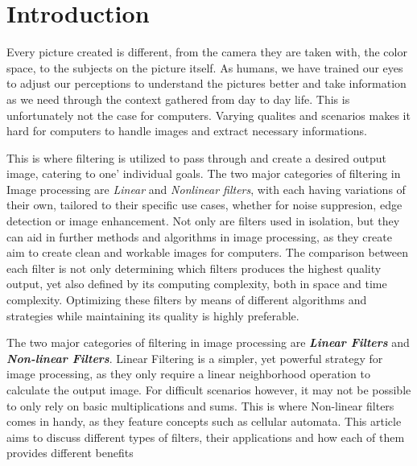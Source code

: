\documentclass[twoside,a4paper,article]{combine}
\begin{document}


\begin{abstract}
\end{abstract}

\tableofcontents
\newpage

\section{Introduction}
Every picture created is different, from the camera they are taken with, the color space, to the subjects on the picture itself. As humans, we have trained our eyes to adjust our perceptions to
understand the pictures better and take information as we need through the context gathered from day to day life. This is unfortunately not the case for computers. Varying qualites and scenarios makes it
hard for computers to handle images and extract necessary informations.

This is where filtering is utilized to pass through and create a desired output image, catering to one' individual goals. The two major categories of filtering in Image processing are \emph{Linear} and \emph{Nonlinear filters}, with each
having variations of their own, tailored to their specific use cases, whether for noise suppresion, edge detection or image enhancement\cite{MISRA2020289}. Not only are filters used in isolation, but they can aid
in further methods and algorithms in image processing, as they create aim to create clean and workable images for computers. The comparison between each filter is not only determining which filters produces the highest quality output, yet
also defined by its computing complexity, both in space and time complexity. Optimizing these filters by means of different algorithms and strategies while maintaining its quality is highly preferable.

The two major categories of filtering in image processing are \textbf{\emph{Linear Filters}} and \textbf{\emph{Non-linear Filters}}. Linear Filtering is a simpler, yet powerful strategy for image processing, as they
only require a linear neighborhood operation to calculate the output image. For difficult scenarios however, it may not be possible to only rely on basic multiplications and sums. This is where Non-linear filters comes in handy, as they
feature concepts such as cellular automata. This article aims to discuss different types of filters, their applications and how each of them provides different benefits\footnotemark{}
\end{document}
